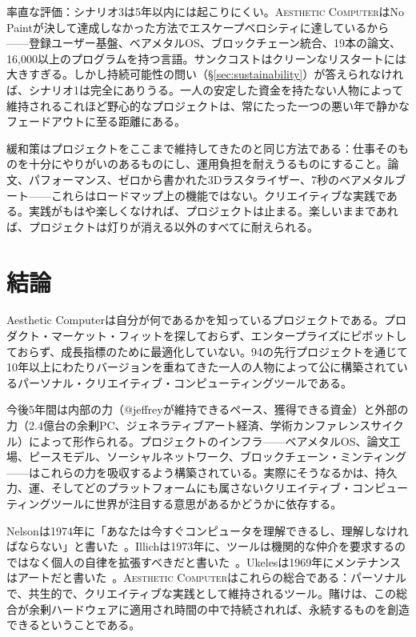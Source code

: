 \documentclass[10pt,letterpaper,twocolumn]{article}
\newcommand{\ac}{\textsc{Aesthetic Computer}}
\begin{document}
率直な評価：シナリオ3は5年以内には起こりにくい。\ac{}はNo Paintが決して達成しなかった方法でエスケープベロシティに達しているから——登録ユーザー基盤、ベアメタルOS、ブロックチェーン統合、19本の論文、16,000以上のプログラムを持つ言語。サンクコストはクリーンなリスタートには大きすぎる。しかし持続可能性の問い（\S\ref{sec:sustainability}）が答えられなければ、シナリオ1は完全にありうる。一人の安定した資金を持たない人物によって維持されるこれほど野心的なプロジェクトは、常にたった一つの悪い年で静かなフェードアウトに至る距離にある。

緩和策はプロジェクトをここまで維持してきたのと同じ方法である：仕事そのものを十分にやりがいのあるものにし、運用負担を耐えうるものにすること。論文、パフォーマンス、ゼロから書かれた3Dラスタライザー、7秒のベアメタルブート——これらはロードマップ上の機能ではない。クリエイティブな実践である。実践がもはや楽しくなければ、プロジェクトは止まる。楽しいままであれば、プロジェクトは灯りが消える以外のすべてに耐えられる。


\section{結論}

Aesthetic Computerは自分が何であるかを知っているプロジェクトである。プロダクト・マーケット・フィットを探しておらず、エンタープライズにピボットしておらず、成長指標のために最適化していない。94の先行プロジェクトを通じて10年以上にわたりバージョンを重ねてきた一人の人物によって公に構築されているパーソナル・クリエイティブ・コンピューティングツールである。

今後5年間は内部の力（@jeffreyが維持できるペース、獲得できる資金）と外部の力（2.4億台の余剰PC、ジェネラティブアート経済、学術カンファレンスサイクル）によって形作られる。プロジェクトのインフラ——ベアメタルOS、論文工場、ピースモデル、ソーシャルネットワーク、ブロックチェーン・ミンティング——はこれらの力を吸収するよう構築されている。実際にそうなるかは、持久力、運、そしてどのプラットフォームにも属さないクリエイティブ・コンピューティングツールに世界が注目する意思があるかどうかに依存する。

Nelsonは1974年に「あなたは今すぐコンピュータを理解できるし、理解しなければならない」と書いた~\citep{nelson1974computerlib}。Illichは1973年に、ツールは機関的な仲介を要求するのではなく個人の自律を拡張すべきだと書いた~\citep{illich1973tools}。Ukelesは1969年にメンテナンスはアートだと書いた~\citep{ukeles1969manifesto}。\ac{}はこれらの総合である：パーソナルで、共生的で、クリエイティブな実践として維持されるツール。賭けは、この総合が余剰ハードウェアに適用され時間の中で持続されれば、永続するものを創造できるということである。
\end{document}
